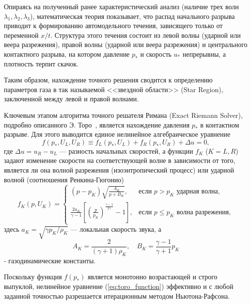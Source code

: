 \documentclass[a4paper,14pt]{extarticle}
\theoremstyle{theorem}
\theoremstyle{lemma}
\begin{document}
    Опираясь на полученный ранее характеристический анализ (наличие трех волн $\lambda_1, \lambda_2, \lambda_3$), математическая теория показывает, что распад начального разрыва приводит к формированию автомодельного течения, зависящего только от переменной $x/t$. Структура этого течения состоит из левой волны (ударной или веера разрежения), правой волны (ударной или веера разрежения) и центрального контактного разрыва, на котором давление $p_*$ и скорость $u_*$ непрерывны, а плотность терпит скачок.

Таким образом, нахождение точного решения сводится к определению параметров газа в так называемой <<звездной области>> (Star Region), заключенной между левой и правой волнами.

Ключевым этапом алгоритма точного решателя Римана (Exact Riemann Solver), подробно описанного Э. Торо~\cite{toro}, является нахождение давления $p_*$ в контактном разрыве. Для этого выводится единое нелинейное алгебраическое уравнение
\begin{equation}
\label{eq:toro_function}
f(p_*, U_L, U_R) \equiv f_L(p_*, U_L) + f_R(p_*, U_R) + \Delta u = 0,
\end{equation}
где $\Delta u = u_R - u_L$ — разность начальных скоростей, а функции $f_K$ ($K = L, R$) задают изменение скорости на соответствующей волне в зависимости от того, является ли она волной разрежения (изоэнтропический процесс) или ударной волной (соотношения Ренкина-Гюгонио)
\begin{equation}
\label{eq:toro_branches}
f_K(p, U_K) = 
\begin{cases}
\displaystyle (p - p_K) \sqrt{\frac{A_K}{p + B_K}}, & \text{если } p > p_K \text{ ударная волна}, \\[10pt]
\displaystyle \frac{2 a_K}{\gamma - 1} \left[ \left(\frac{p}{p_K}\right)^{\displaystyle \frac{\gamma - 1}{2\gamma}} - 1 \right], & \text{если } p \leq p_K \text{ волна разрежения},
\end{cases}
\end{equation}
здесь $a_K = \sqrt{\gamma p_K / \rho_K}$ --- локальная скорость звука, а 
\begin{equation}
    A_K = \frac{2}{(\gamma + 1)\rho_K}, \quad B_K = \frac{\gamma - 1}{\gamma + 1} p_K
\end{equation} 
- газодинамические константы.

Поскольку функция $f(p_*)$ является монотонно возрастающей и строго выпуклой, нелинейное уравнение (\ref{eq:toro_function}) эффективно и с любой заданной точностью разрешается итерационным методом Ньютона-Рафсона. 
\end{document}
